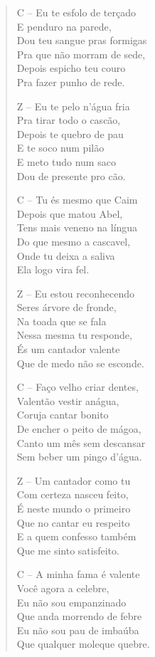\begin{verse}
C – Eu te esfolo de terçado\\
E penduro na parede,\\
Dou teu sangue pras formigas\\
Pra que não morram de sede,\\
Depois espicho teu couro\\
Pra fazer punho de rede.

Z – Eu te pelo n’água fria\\
Pra tirar todo o cascão,\\
Depois te quebro de pau\\
E te soco num pilão\\
E meto tudo num saco\\
Dou de presente pro cão.

C – Tu és mesmo que Caim\\
Depois que matou Abel,\\
Tens mais veneno na língua\\
Do que mesmo a cascavel,\\
Onde tu deixa a saliva\\
Ela logo vira fel.
\pagebreak

Z – Eu estou reconhecendo\\
Seres árvore de fronde,\\
Na toada que se fala\\
Nessa mesma tu responde,\\
És um cantador valente\\
Que de medo não se esconde.

C – Faço velho criar dentes, \\
Valentão vestir anágua,\\
Coruja cantar bonito\\
De encher o peito de mágoa,\\
Canto um mês sem descansar\\
Sem beber um pingo d’água.

Z – Um cantador como tu\\
Com certeza nasceu feito,\\
É neste mundo o primeiro\\
Que no cantar eu respeito\\
E a quem confesso também\\
Que me sinto satisfeito.

C – A minha fama é valente\\
Você agora a celebre, \\
Eu não sou empanzinado\\
Que anda morrendo de febre\\
Eu não sou pau de imbaúba\\
Que qualquer moleque quebre.
\pagebreak


\end{verse}

